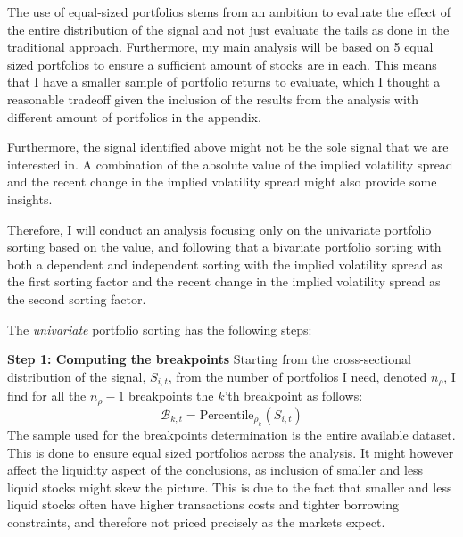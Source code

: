The use of equal-sized portfolios stems from an ambition to evaluate the effect of the entire distribution of the signal and not just evaluate the tails as done in the traditional approach. Furthermore, my main analysis will be based on 5 equal sized portfolios to ensure a sufficient amount of stocks are in each. This means that I have a smaller sample of portfolio returns to evaluate, which I thought a reasonable tradeoff given the inclusion of the results from the analysis with different amount of portfolios in the appendix.

Furthermore, the signal identified above might not be the sole signal that we are interested in. A combination of the absolute value of the implied volatility spread and the recent change in the implied volatility spread might also provide some insights. 

Therefore, I will conduct an analysis focusing only on the univariate portfolio sorting based on the value, and following that a bivariate portfolio sorting with both a dependent and independent sorting with the implied volatility spread as the first sorting factor and the recent change in the implied volatility spread as the second sorting factor.

The \textit{univariate} portfolio sorting has the following steps:

\textbf{Step 1: Computing the breakpoints } Starting from the cross-sectional distribution of the signal, $S_{i,t}$, from the number of portfolios I need, denoted $n_{\rho}$, I find for all the $n_{\rho}-1$ breakpoints the $k$'th breakpoint as follows:
\begin{equation}\label{eq:step1uni}
	\mathcal{B}_{k,t}=\text{Percentile}_{\rho_{k}}\left(S_{i,t}\right)
\end{equation}
The sample used for the breakpoints determination is the entire available dataset. This is done to ensure equal sized portfolios across the analysis. It might however affect the liquidity aspect of the conclusions, as inclusion of smaller and less liquid stocks might skew the picture. This is due to the fact that smaller and less liquid stocks often have higher transactions costs and tighter borrowing constraints, and therefore not priced precisely as the markets expect.

